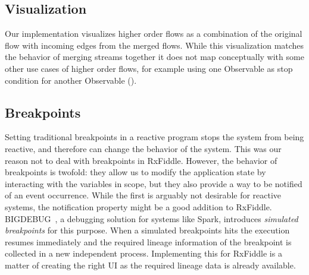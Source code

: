 \subsection{Visualization}
Our implementation visualizes higher order flows as a combination of the original flow with incoming edges from the merged flows. While this visualization matches the behavior of merging streams together it does not map conceptually with some other use cases of higher order flows, for example using one Observable as stop condition for another Observable ().

\subsection{Breakpoints}
Setting traditional breakpoints in a reactive program stops the system from being reactive, and therefore can change the behavior of the system. This was our reason not to deal with breakpoints in RxFiddle. However, the behavior of breakpoints is twofold: they allow us to modify the application state by interacting with the variables in scope, but they also provide a way to be notified of an event occurrence. While the first is arguably not desirable for reactive systems, the notification property might be a good addition to RxFiddle. BIGDEBUG~\cite{Gulzar2016}, a debugging solution for systems like Spark, introduces \textit{simulated breakpoints} for this purpose. When a simulated breakpoints hits the execution resumes immediately and the required lineage information of the breakpoint is collected in a new independent process. Implementing this for RxFiddle is a matter of creating the right UI as the required lineage data is already available.

